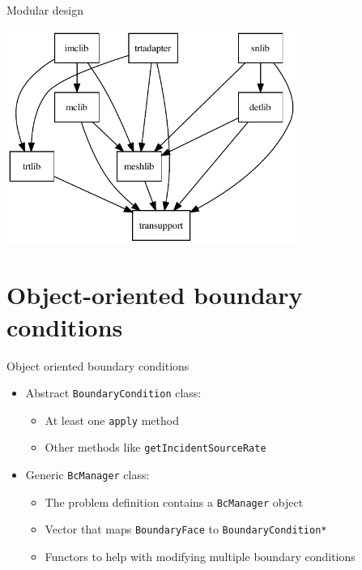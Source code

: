 \documentclass{beamer}
\begin{document}
\begin{frame}{Modular design}

{\centering\includegraphics[height=2.75in]{hierarchy}\par}

\end{frame}

\section{Object-oriented boundary conditions}
\begin{frame}[fragile]{Object oriented boundary conditions}
  \begin{itemize}
\item Abstract \verb|BoundaryCondition| class:
  \begin{itemize}
    \item At least one \verb|apply| method
    \item Other methods like \verb|getIncidentSourceRate|
  \end{itemize}

\item Generic \verb|BcManager| class:
  \begin{itemize}
    \item The problem definition contains a \verb|BcManager| object
    \item Vector that maps \verb|BoundaryFace| to \verb|BoundaryCondition*|
    \item Functors to help with modifying multiple boundary conditions
  \end{itemize}
\end{itemize}
\end{frame}
\end{document}
